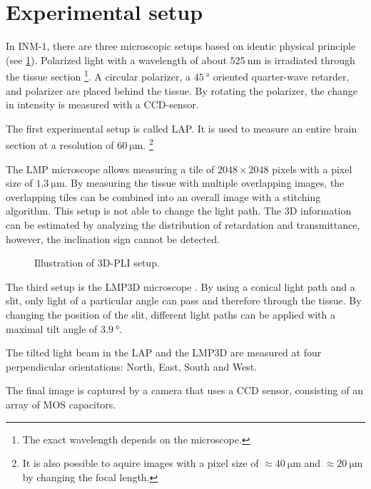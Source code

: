 \section{Experimental setup}\label{sec:expSetup}
%
In \ac{INM-1}, there are three microscopic setups based on identic physical principle \cite{Axer2011} (see \cref{fig:pli_setup}).
Polarized light with a wavelength of about $\SI{525}{\nano\meter}$ is irradiated through the tissue section \footnote{The exact wavelength depends on the microscope.}.
A circular polarizer, a $\SI{45}{\degree}$ oriented quarter-wave retarder, and polarizer are placed behind the tissue.
By rotating the polarizer, the change in intensity is measured with a \ac{CCD}-sensor.
\par
% 
The first experimental setup is called \ac{LAP}.
It is used to measure an entire brain section at a resolution of $\SI{60}{\micro\meter}$. \footnote{It is also possible to aquire images with a pixel size of $\approx \SI{40}{\micro\meter}$ and $\approx \SI{20}{\micro\meter}$ by changing the focal length.}
\par
% 
The \ac{LMP} microscope allows measuring a tile of $\num{2048}\times\num{2048}$ pixels with a pixel size of $\SI{1.3}{\micro\meter}$.
By measuring the tissue with multiple overlapping images, the overlapping tiles can be combined into an overall image with a stitching algorithm. 
This setup is not able to change the light path.
The 3D information can be estimated by analyzing the distribution of retardation and transmittance, however, the inclination sign cannot be detected.
\par
% 
\begin{figure}[!t]
    \captionsetup[sub]{position=top}
    \setlength{\tikzwidth}{\textwidth}
	\centering
	\caption{Illustration of \acs{3D-PLI} setup.}
	\label{fig:pli_setup}
\end{figure}
% 
The third setup is the \ac{LMP3D} microscope \cite{Wiese:887678}.
By using a conical light path and a slit, only light of a particular angle can pass and therefore through the tissue.
By changing the position of the slit, different light paths can be applied with a maximal tilt angle of $\SI{3.9}{\degree}$.
\par
% 
The tilted light beam in the \acs{LAP} and the \acs{LMP3D} are measured at four perpendicular orientations: North, East, South and West.
\par
%
The final image is captured by a camera that uses a \ac{CCD} sensor, consisting of an array of \ac{MOS} capacitors.
